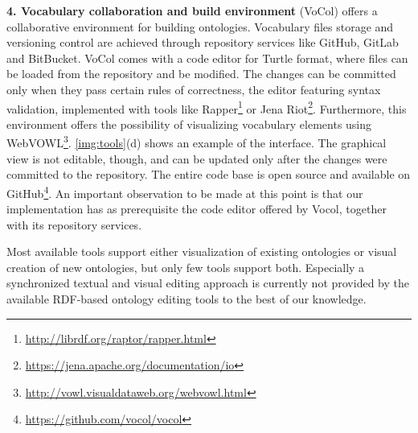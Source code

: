 \textbf{4. Vocabulary collaboration and build environment} (VoCol) \cite{Halilaj2016} offers a collaborative environment for building ontologies. Vocabulary files storage and versioning control are achieved through repository services like GitHub, GitLab and BitBucket. VoCol comes with a code editor for Turtle format, where files can be loaded from the repository and be modified. The changes can be committed only when they pass certain rules of correctness, the editor featuring syntax validation, implemented with tools like Rapper\footnote{\url{http://librdf.org/raptor/rapper.html}} or Jena Riot\footnote{\url{https://jena.apache.org/documentation/io}}. Furthermore, this environment offers the possibility of visualizing vocabulary elements using WebVOWL\footnote{\url{http://vowl.visualdataweb.org/webvowl.html}}. \autoref{img:tools}(d) shows an example of the interface. The graphical view is not editable, though, and can be updated only after the changes were committed to the repository. The entire code base is open source and available on GitHub\footnote{\url{https://github.com/vocol/vocol}}. An important observation to be made at this point is that our implementation has as prerequisite the code editor offered by Vocol, together with its repository services.

Most available tools support either visualization of existing ontologies or visual creation of new ontologies, but only few tools support both. Especially a synchronized textual and visual editing approach is currently not provided by the available RDF-based ontology editing tools to the best of our knowledge.


